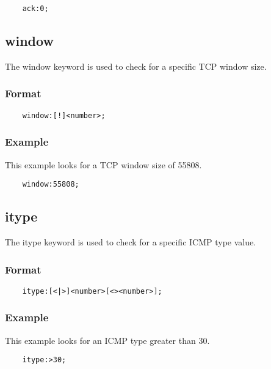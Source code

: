 \documentclass[english]{report}
\begin{document}
\begin{verbatim}
    ack:0;
\end{verbatim}

\subsection{window}

The window keyword is used to check for a specific TCP window size.

\subsubsection{Format}

\begin{verbatim}
    window:[!]<number>;
\end{verbatim}

\subsubsection{Example}

This example looks for a TCP window size of 55808.

\begin{verbatim}
    window:55808;
\end{verbatim}

\subsection{itype}

The itype keyword is used to check for a specific ICMP type value.

\subsubsection{Format}

\begin{verbatim}
    itype:[<|>]<number>[<><number>];
\end{verbatim}

\subsubsection{Example}

This example looks for an ICMP type greater than 30.

\begin{verbatim}
    itype:>30;
\end{verbatim}
\end{document}
